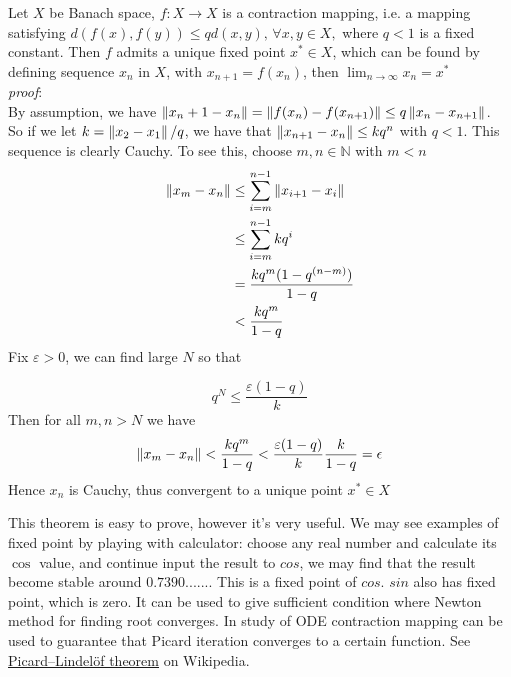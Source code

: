 \documentclass{article}
\begin{document}
\begin{theorem}\rm \nextline
	Let $X$ be Banach space, $f:X\xrightarrow{}X$ is a contraction mapping, i.e. a mapping satisfying
	$
		d(f(x),f(y))\leq qd(x,y),\,\forall x,y\in X,
	$
	where $q<1$ is a fixed constant.
	Then $f$ admits a unique fixed point $x^*\in X$, which can be found by
	defining sequence ${x_n}$ in $X$, with $x_{n+1}=f(x_n)$, then $\lim_{n\to \infty}x_n=x^*$\\
	\textit{proof}:\\
	By assumption, we have $\left\|{x_n+1-x_n}\right\|=\left\|{f(x_n)-f(x_{n+1})}\right\|\leq q\left\|{x_n-x_{n+1}}\right\|$.\\
	So if we let $k=\left\|{x_2-x_1}\right\|/q$, we have that $\left\|{x_{n+1}-x_n}\right\|\leq k q^n$ with $q<1$.
	This sequence is clearly Cauchy. To see this, choose $m,n\in\mathbb{N}$ with $m<n$
	\begin{equation}
		\begin{split}
			\left\|{x_m-x_n}\right\|&\leq\sum_{i=m}^{n-1} \left\|{x_{i+1}-x_i}\right\|\\
			&\leq\sum_{i=m}^{n-1} k q^i\\
			&=\frac{kq^{m} (1-q^{(n-m)})}{1-q}\\
			&< \frac{kq^{m}}{1-q}\\
		\end{split}
	\end{equation}
	Fix $\varepsilon>0$, we can find large  $N$ so that

	$$
		q^N\leq \frac{\varepsilon(1-q)}{k}
	$$
	Then for all $m,n>N$ we have
	$$
		\left\|{x_m-x_n}\right\|<\frac{kq^{m}}{1-q}<\frac{\varepsilon(1-q)}{k}\frac{k}{1-q}=\epsilon
	$$
	Hence ${x_n}$ is Cauchy, thus convergent to a unique point $x^*\in X$
\end{theorem}

\begin{remark}\rm\nextline
	This theorem is easy to prove, however it's very useful. We may see examples of fixed point by playing with calculator: choose any real number and calculate its $\cos$ value, and continue input the result to $cos$, we may find that the result become stable around $0.7390......$. This is a fixed point of $cos$. $sin$ also has fixed point, which is zero. It can be used to give sufficient condition where Newton method for finding root converges. In study of ODE contraction mapping can be used to guarantee that Picard iteration converges to a certain function. See \href{https://en.wikipedia.org/wiki/Picard–Lindelöf_theorem}{Picard–Lindelöf theorem} on Wikipedia.
\end{remark}
\end{document}
